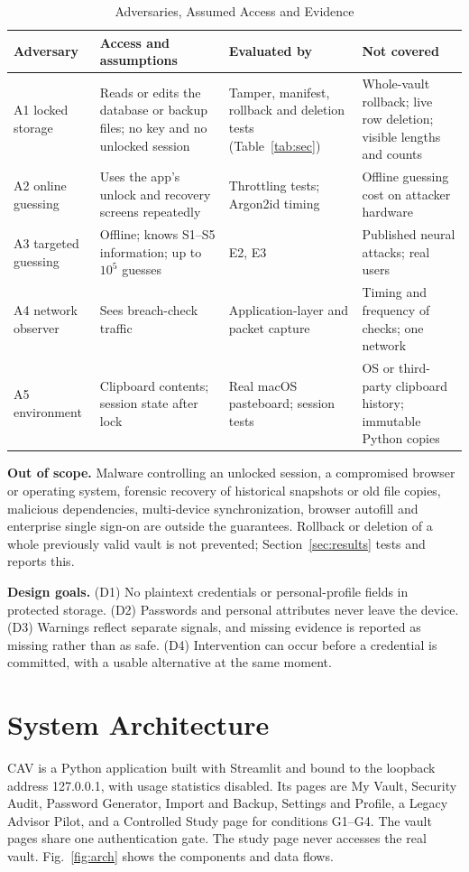 \documentclass[preprint,12pt]{elsarticle}
\begin{document}
\begin{table}[t]
\caption{Adversaries, Assumed Access and Evidence}
\label{tab:threats}
\centering\scriptsize
\begin{tabular}{@{}p{}p{}p{}p{}@{}}
\toprule
Adversary & Access and assumptions & Evaluated by & Not covered\\
\midrule
A1 locked storage & Reads or edits the database or backup files; no key and no unlocked session & Tamper, manifest, rollback and deletion tests (Table~\ref{tab:sec}) & Whole-vault rollback; live row deletion; visible lengths and counts\\
A2 online guessing & Uses the app's unlock and recovery screens repeatedly & Throttling tests; Argon2id timing & Offline guessing cost on attacker hardware\\
A3 targeted guessing & Offline; knows S1--S5 information; up to $10^5$ guesses & E2, E3 & Published neural attacks; real users\\
A4 network observer & Sees breach-check traffic & Application-layer and packet capture & Timing and frequency of checks; one network\\
A5 environment & Clipboard contents; session state after lock & Real macOS pasteboard; session tests & OS or third-party clipboard history; immutable Python copies\\
\bottomrule
\end{tabular}
\end{table}

\textbf{Out of scope.} Malware controlling an unlocked session, a compromised browser or operating system, forensic recovery of historical snapshots or old file copies, malicious dependencies, multi-device synchronization, browser autofill and enterprise single sign-on are outside the guarantees. Rollback or deletion of a whole previously valid vault is not prevented; Section~\ref{sec:results} tests and reports this.

\textbf{Design goals.} (D1) No plaintext credentials or personal-profile fields in protected storage. (D2) Passwords and personal attributes never leave the device. (D3) Warnings reflect separate signals, and missing evidence is reported as missing rather than as safe. (D4) Intervention can occur before a credential is committed, with a usable alternative at the same moment.

\section{System Architecture}
CAV is a Python application built with Streamlit and bound to the loopback address 127.0.0.1, with usage statistics disabled. Its pages are My Vault, Security Audit, Password Generator, Import and Backup, Settings and Profile, a Legacy Advisor Pilot, and a Controlled Study page for conditions G1--G4. The vault pages share one authentication gate. The study page never accesses the real vault. Fig.~\ref{fig:arch} shows the components and data flows.
\end{document}
